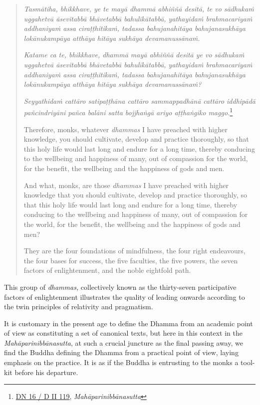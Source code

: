 \begin{quote}
\emph{Tasmātiha, bhikkhave, ye te mayā dhammā abhiññā desitā, te vo sādhukaṁ uggahetvā āsevitabbā bhāvetabbā bahulīkātabbā, yathayidaṁ brahmacariyaṁ addhaniyaṁ assa ciraṭṭhitikaṁ, tadassa bahujanahitāya bahujanasukhāya lokānukampāya atthāya hitāya sukhāya devamanussānaṁ.}

\emph{Katame ca te, bhikkhave, dhammā mayā abhiññā desitā ye vo sādhukaṁ uggahetvā āsevitabbā bhāvetabbā bahulīkātabbā, yathayidaṁ brahmacariyaṁ addhaniyaṁ assa ciraṭṭhitikaṁ, tadassa bahujanahitāya bahujanasukhāya lokānukampāya atthāya hitāya sukhāya devamanussānaṁ?}

\emph{Seyyathidaṁ cattāro satipaṭṭhāna cattāro sammappadhānā cattāro iddhipādā pañcindriyāni pañca balāni satta bojjhaṅgā ariyo aṭṭhaṅgiko maggo.}\footnote{\href{https://suttacentral.net/dn16/pli/ms}{DN 16 / D II 119}, \emph{Mahāparinibbānasutta}}

Therefore, monks, whatever \emph{dhammas} I have preached with higher knowledge, you should cultivate, develop and practice thoroughly, so that this holy life would last long and endure for a long time, thereby conducing to the wellbeing and happiness of many, out of compassion for the world, for the benefit, the wellbeing and the happiness of gods and men.

And what, monks, are those \emph{dhammas} I have preached with higher knowledge that you should cultivate, develop and practice thoroughly, so that this holy life would last long and endure for a long time, thereby conducing to the wellbeing and happiness of many, out of compassion for the world, for the benefit, the wellbeing and the happiness of gods and men?

They are the four foundations of mindfulness, the four right endeavours, the four bases for success, the five faculties, the five powers, the seven factors of enlightenment, and the noble eightfold path.
\end{quote}

This group of \emph{dhammas,} collectively known as the thirty-seven participative factors of enlightenment illustrates the quality of leading onwards according to the twin principles of relativity and pragmatism.

It is customary in the present age to define the Dhamma from an academic point of view as constituting a set of canonical texts, but here in this context in the \emph{Mahāparinibbānasutta}, at such a crucial juncture as the final passing away, we find the Buddha defining the Dhamma from a practical point of view, laying emphasis on the practice. It is as if the Buddha is entrusting to the monks a tool-kit before his departure.

